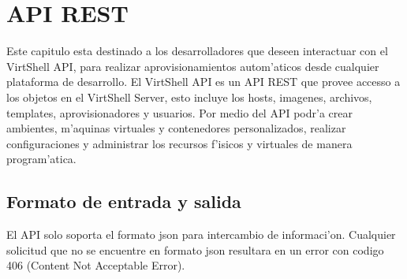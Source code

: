\chapter{API REST}
\label{capapi}

Este capitulo esta destinado a los desarrolladores que deseen interactuar con el VirtShell API, para realizar aprovisionamientos autom'aticos desde cualquier plataforma de desarrollo. El VirtShell API es un API REST que provee accesso a los objetos en el VirtShell Server, esto incluye los hosts, imagenes, archivos, templates, aprovisionadores y usuarios. Por medio del API podr'a crear ambientes, m'aquinas virtuales y contenedores personalizados, realizar configuraciones y administrar los recursos f'isicos y virtuales de manera program'atica. 

\section{Formato de entrada y salida}
El API solo soporta el formato json para intercambio de informaci'on. Cualquier solicitud que no se encuentre en formato json resultara en un error con codigo 406 (Content Not Acceptable Error).

















